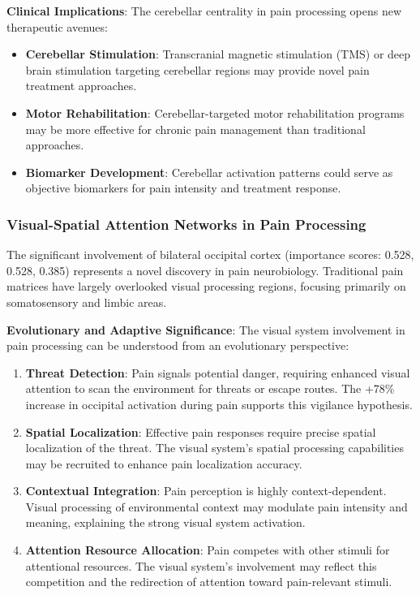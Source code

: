 \textbf{Clinical Implications}:
The cerebellar centrality in pain processing opens new therapeutic avenues:

\begin{itemize}
\item \textbf{Cerebellar Stimulation}: Transcranial magnetic stimulation (TMS) or deep brain stimulation targeting cerebellar regions may provide novel pain treatment approaches.
\item \textbf{Motor Rehabilitation}: Cerebellar-targeted motor rehabilitation programs may be more effective for chronic pain management than traditional approaches.
\item \textbf{Biomarker Development}: Cerebellar activation patterns could serve as objective biomarkers for pain intensity and treatment response.
\end{itemize}

\subsubsection{Visual-Spatial Attention Networks in Pain Processing}

The significant involvement of bilateral occipital cortex (importance scores: 0.528, 0.528, 0.385) represents a novel discovery in pain neurobiology. Traditional pain matrices have largely overlooked visual processing regions, focusing primarily on somatosensory and limbic areas.

\textbf{Evolutionary and Adaptive Significance}:
The visual system involvement in pain processing can be understood from an evolutionary perspective:

\begin{enumerate}
\item \textbf{Threat Detection}: Pain signals potential danger, requiring enhanced visual attention to scan the environment for threats or escape routes. The +78\% increase in occipital activation during pain supports this vigilance hypothesis.

\item \textbf{Spatial Localization}: Effective pain responses require precise spatial localization of the threat. The visual system's spatial processing capabilities may be recruited to enhance pain localization accuracy.

\item \textbf{Contextual Integration}: Pain perception is highly context-dependent. Visual processing of environmental context may modulate pain intensity and meaning, explaining the strong visual system activation.

\item \textbf{Attention Resource Allocation}: Pain competes with other stimuli for attentional resources. The visual system's involvement may reflect this competition and the redirection of attention toward pain-relevant stimuli.
\end{enumerate}

